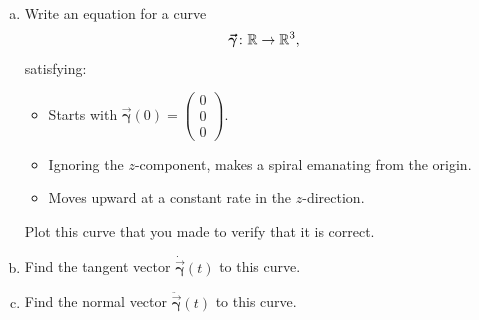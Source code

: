 \documentclass[12pt]{article} %
\newcommand{\curvegamma}{\boldsymbol{\vec{\gamma}}}
\newcommand{\tangentgamma}{\boldsymbol{\dot{\vec{\gamma}}}}
\newcommand{\normalgamma}{\boldsymbol{\ddot{\vec{\gamma}}}}
\begin{document}
\newpage
\begin{problem}~
\begin{enumerate}[(a)]
\item Write an equation for a curve
\[
\curvegamma \colon \R \to \R^3,
\]
satisfying:
\begin{itemize}
    \item Starts with $\curvegamma(0)=\begin{pmatrix} 0 \\ 0 \\ 0 \end{pmatrix}$.
    \item Ignoring the $z$-component, makes a spiral emanating from the origin.
    \item Moves upward at a constant rate in the $z$-direction.
\end{itemize}
Plot this curve that you made to verify that it is correct.
\item Find the tangent vector $\tangentgamma(t)$ to this curve.
\item Find the normal vector $\normalgamma(t)$ to this curve.
\end{enumerate}
\end{problem}
\end{document}
